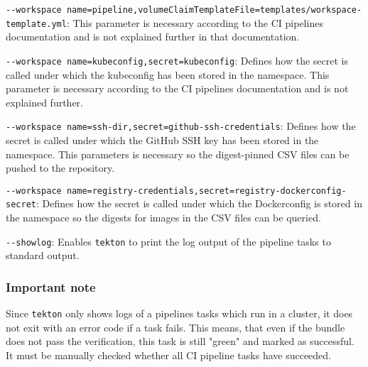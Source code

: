 \verb|--workspace name=pipeline,volumeClaimTemplateFile=templates/workspace-template.yml|: This parameter is necessary according to the CI pipelines documentation and is not explained further in that documentation.

\verb|--workspace name=kubeconfig,secret=kubeconfig|: Defines how the secret is called under which the kubeconfig has been stored in the namespace.
    This parameter is necessary according to the CI pipelines documentation and is not explained further.

\verb|--workspace name=ssh-dir,secret=github-ssh-credentials|: Defines how the secret is called under which the GitHub SSH key has been stored in the namespace.
    This parameters is necessary so the digest-pinned CSV files can be pushed to the repository.

\verb|--workspace name=registry-credentials,secret=registry-dockerconfig-secret|: Defines how the secret is called under which the Dockerconfig is stored in the namespace so the digests for images in the CSV files can be queried.

\verb|--showlog|: Enables \verb|tekton| to print the log output of the pipeline tasks to standard output.

\subsubsection{Important note}\label{subsubsec:test-certified-operators-important-note}

Since \verb|tekton| only shows logs of a pipelines tasks which run in a cluster, it does not exit with an error code if a task fails.
This means, that even if the bundle does not pass the verification, this task is still "green" and marked as successful.
It must be manually checked whether all CI pipeline tasks have succeeded.
